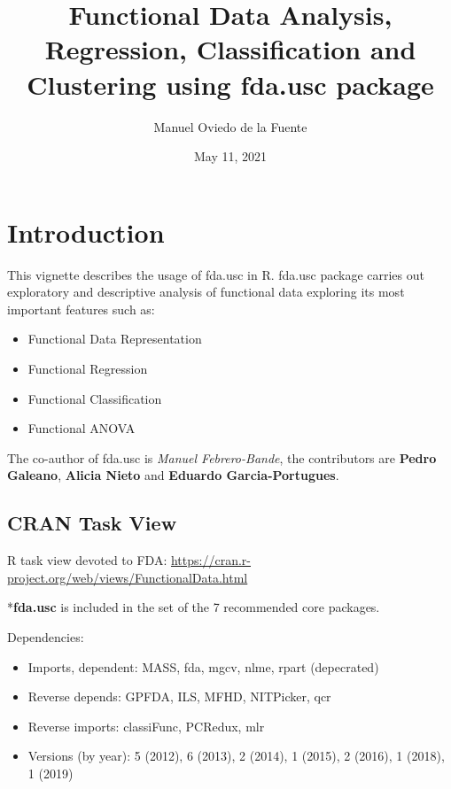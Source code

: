 \documentclass[
]{book}
\title{Functional Data Analysis, Regression, Classification and Clustering using fda.usc package}
\author{Manuel Oviedo de la Fuente}
\date{May 11, 2021}
\begin{document}
\maketitle

{
\setcounter{tocdepth}{1}
\tableofcontents
}
\hypertarget{introduction}{%
\chapter*{Introduction}\label{introduction}}

This vignette describes the usage of fda.usc in R.
fda.usc package carries out exploratory and descriptive analysis of functional data exploring its most important features such as:

\begin{itemize}
\item
  Functional Data Representation
\item
  Functional Regression
\item
  Functional Classification
\item
  Functional ANOVA
\end{itemize}

The co-author of fda.usc is \emph{Manuel Febrero-Bande}, the contributors are \textbf{Pedro Galeano}, \textbf{Alicia Nieto} and \textbf{Eduardo Garcia-Portugues}.

\hypertarget{cran-task-view}{%
\section*{CRAN Task View}\label{cran-task-view}}

R task view devoted to FDA: \url{https://cran.r-project.org/web/views/FunctionalData.html}

*\textbf{fda.usc} is included in the set of the 7 recommended core packages.

Dependencies:

\begin{itemize}
\item
  Imports, dependent: MASS, fda, mgcv, nlme, rpart (depecrated)
\item
  Reverse depends: GPFDA, ILS, MFHD, NITPicker, qcr
\item
  Reverse imports: classiFunc, PCRedux, mlr
\item
  Versions (by year): 5 (2012), 6 (2013), 2 (2014), 1 (2015), 2 (2016), 1 (2018), 1 (2019)
\end{itemize}
\end{document}
